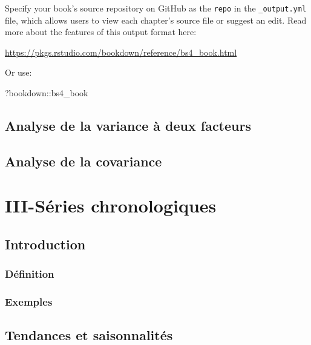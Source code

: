 \documentclass[
]{book}
\newenvironment{Shaded}{\begin{snugshade}}{\end{snugshade}}
\newcommand{\NormalTok}[1]{#1}
\newcommand{\SpecialCharTok}[1]{\textcolor[rgb]{0.00,0.00,0.00}{#1}}
\theoremstyle{definition}
\theoremstyle{definition}
\theoremstyle{definition}
\theoremstyle{definition}
\theoremstyle{remark}
\begin{document}
Specify your book's source repository on GitHub as the \texttt{repo} in the \texttt{\_output.yml} file, which allows users to view each chapter's source file or suggest an edit. Read more about the features of this output format here:

\url{https://pkgs.rstudio.com/bookdown/reference/bs4_book.html}

Or use:

\begin{Shaded}
\begin{Highlighting}[]
\NormalTok{?bookdown}\SpecialCharTok{::}\NormalTok{bs4\_book}
\end{Highlighting}
\end{Shaded}

\hypertarget{anova2}{%
\chapter{Analyse de la variance à deux facteurs}\label{anova2}}

\hypertarget{ancova}{%
\chapter{Analyse de la covariance}\label{ancova}}

\hypertarget{part-iii-suxe9ries-chronologiques}{%
\part{III-Séries chronologiques}\label{part-iii-suxe9ries-chronologiques}}

\hypertarget{intro-ts}{%
\chapter{Introduction}\label{intro-ts}}

\hypertarget{duxe9finition-5}{%
\section{Définition}\label{duxe9finition-5}}

\hypertarget{exemples}{%
\section{Exemples}\label{exemples}}

\hypertarget{tendances-et-saisonnalituxe9s}{%
\chapter{Tendances et saisonnalités}\label{tendances-et-saisonnalituxe9s}}
\end{document}

